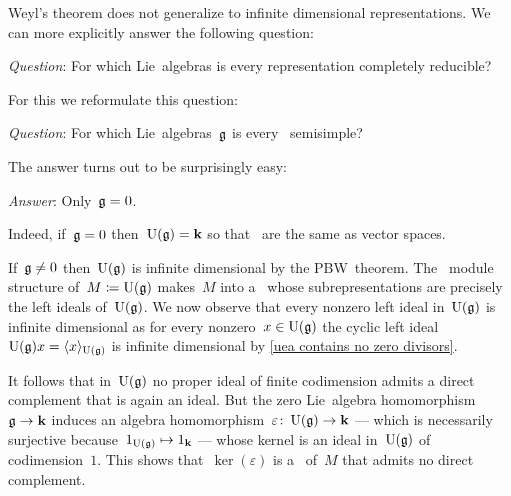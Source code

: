 \begin{warning}
  Weyl’s theorem does not generalize to infinite dimensional representations.
  We can more explicitly answer the following question:
  \begin{center}
    \emph{Question}:
    For which Lie~algebras is every representation completely reducible?
  \end{center}
  For this we reformulate this question:
  \begin{center}
    \emph{Question}:
    For which Lie~algebras~$\glie$ is every~{\module{$\Univ(\glie)$}} semisimple?
  \end{center}
  The answer turns out to be surprisingly easy:
  \begin{center}
    \emph{Answer}:
    Only~$\mathfrak{g} = 0$.
  \end{center}
  Indeed, if~$\mathfrak{g} = 0$ then~$\operatorname{U}(\mathfrak{g}) = \mathbf{k}$ so that~{\modules{$\Univ(\glie)$}} are the same as vector spaces.
  
  If~$\mathfrak{g} \neq 0$ then~$\Univ(\glie)$ is infinite dimensional by the PBW~theorem.
  The~{\module{$\Univ(\glie)$}} module structure of~$M \coloneqq \operatorname{U}(\mathfrak{g})$ makes~$M$ into a~{\representation{$\glie$}} whose subrepresentations are precisely the left ideals of~$\Univ(\glie)$.
  We now observe that every nonzero left ideal in~$\Univ(\glie)$ is infinite dimensional as for every nonzero~$x \in \operatorname{U}(\mathfrak{g})$ the cyclic left ideal~$\operatorname{U}(\mathfrak{g}) x = \langle x\rangle_{\operatorname{U}(\mathfrak{g})}$ is infinite dimensional by \cref{uea contains no zero divisors}.
  
  It follows that in~$\Univ(\glie)$ no proper ideal of finite codimension admits a direct complement that is again an ideal.
  But the zero Lie~algebra homomorphism~$\mathfrak{g} \to \mathbf{k}$ induces an algebra homomorphism~$\varepsilon \colon \operatorname{U}(\mathfrak{g}) \to \mathbf{k}$ --- which is necessarily surjective because~$1_{\operatorname{U}(\mathfrak{g})} \mapsto 1_{\mathbf{k}}$ --- whose kernel is an ideal in~$\Univ(\glie)$ of codimension~$1$. 
  This shows that~$\ker(\varepsilon)$ is a~{\subrepresentation{$\glie$}} of~$M$ that admits no direct complement.
  

\end{warning}
